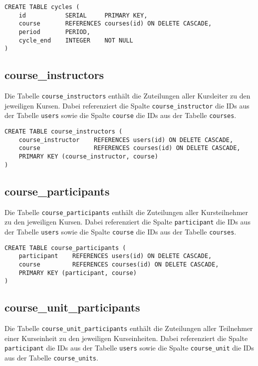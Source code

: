 \begin{verbatim}
CREATE TABLE cycles (
    id           SERIAL     PRIMARY KEY,
    course       REFERENCES courses(id) ON DELETE CASCADE,
    period       PERIOD,
    cycle_end    INTEGER    NOT NULL
)
\end{verbatim}

\subsection{course_instructors}
Die Tabelle \texttt{course_instructors} enthält die Zuteilungen aller Kursleiter zu den jeweiligen Kursen. Dabei referenziert die Spalte \texttt{course_instructor} die IDs aus der Tabelle \texttt{users} sowie die Spalte \texttt{course} die IDs aus der Tabelle \texttt{courses}.

\begin{verbatim}
CREATE TABLE course_instructors (
    course_instructor    REFERENCES users(id) ON DELETE CASCADE,
    course               REFERENCES courses(id) ON DELETE CASCADE,
	PRIMARY KEY (course_instructor, course)
)
\end{verbatim}

\subsection{course_participants}
Die Tabelle \texttt{course_participants} enthält die Zuteilungen aller Kursteilnehmer zu den jeweiligen Kursen. Dabei referenziert die Spalte \texttt{participant} die IDs aus der Tabelle \texttt{users} sowie die Spalte \texttt{course} die IDs aus der Tabelle \texttt{courses}.

\begin{verbatim}
CREATE TABLE course_participants (
    participant    REFERENCES users(id) ON DELETE CASCADE,
    course         REFERENCES courses(id) ON DELETE CASCADE,
    PRIMARY KEY (participant, course)
)
\end{verbatim}

\subsection{course_unit_participants}
Die Tabelle \texttt{course_unit_participants} enthält die Zuteilungen aller Teilnehmer einer Kurseinheit zu den jeweiligen Kurseinheiten. Dabei referenziert die Spalte \texttt{participant} die IDs aus der Tabelle \texttt{users} sowie die Spalte \texttt{course_unit} die IDs aus der Tabelle \texttt{course_units}.

